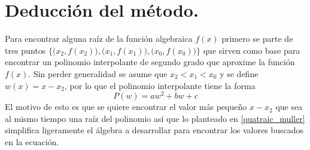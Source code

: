 \section{Deducción del método.}
Para encontrar alguna raíz de la función algebraica $f(x)$ primero 
se parte de tres puntos $\bigl\{\bigl(x_2,f(x_2)\bigr),\bigl(x_1,f(x_1)\bigr),\bigl(x_0,f(x_0)\bigr)\bigr\}$ que sirven como base para 
encontrar un polinomio interpolante de segundo grado que aproxime la función
$f(x)$. Sin perder generalidad se asume que $x_2<x_1<x_0$ y se define $w(x)=x-x_2$, por lo
que el polinomio interpolante tiene la forma
\begin{equation}
    \label{quatraic_muller}
    P(w)=aw^2+bw+c
\end{equation}
El motivo de esto es que se quiere encontrar el valor más pequeño $x-x_2$ que sea al mismo tiempo
una raíz del polinomio así que lo planteado en \ref{quatraic_muller} simplifica ligeramente
el álgebra a desarrollar para encontrar los valores buscados en la ecuación.\\

